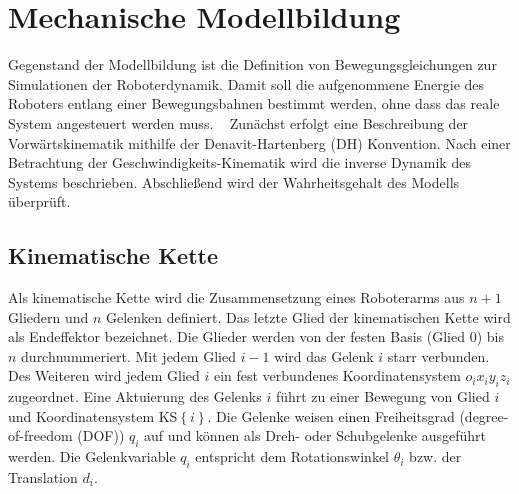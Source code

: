 \chapter{Mechanische Modellbildung}
%
Gegenstand der Modellbildung ist die Definition von Bewegungsgleichungen zur Simulationen der Roboterdynamik. Damit soll die aufgenommene Energie des Roboters entlang einer Bewegungsbahnen bestimmt werden, ohne dass das reale System angesteuert werden muss. ~\autocite[S.~247]{Grimble.2009} Zunächst erfolgt eine Beschreibung der Vorwärtskinematik mithilfe der Denavit-Hartenberg (DH) Konvention.
Nach einer Betrachtung der Geschwindigkeits-Kinematik wird die inverse Dynamik des Systems beschrieben. 
Abschließend wird der Wahrheitsgehalt des Modells überprüft. 

\section{Kinematische Kette}
Als kinematische Kette wird die Zusammensetzung eines Roboterarms aus $n+1$ Gliedern und $n$ Gelenken definiert. Das letzte Glied der kinematischen Kette wird als Endeffektor bezeichnet. Die Glieder werden von der festen Basis (Glied $0$) bis $n$ durchnummeriert. Mit jedem Glied $i-1$ wird das Gelenk $i$ starr verbunden. Des Weiteren wird jedem Glied $i$ ein fest verbundenes Koordinatensystem $o_ix_iy_iz_i$ zugeordnet. Eine Aktuierung des Gelenks $i$ führt zu einer Bewegung von Glied $i$ und Koordinatensystem KS$\left\{i\right\}$. Die Gelenke weisen einen Freiheitsgrad (degree-of-freedom (DOF)) $q_i$ auf und können als Dreh- oder Schubgelenke ausgeführt werden. Die Gelenkvariable $q_i$ entspricht dem Rotationswinkel $\theta_i$ bzw. der Translation $d_i$. 


